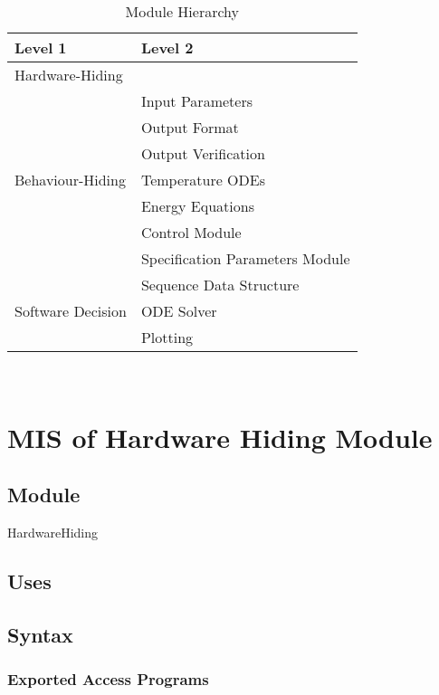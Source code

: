 \documentclass[12pt, titlepage]{article}
\begin{document}
\begin{table}[h!]
\centering
\begin{tabular}{p{} p{}}
\toprule
\textbf{Level 1} & \textbf{Level 2}\\
\midrule

{Hardware-Hiding} & ~ \\
\midrule

\multirow{7}{0.3\textwidth}{Behaviour-Hiding} & Input Parameters\\
& Output Format\\
& Output Verification\\
& Temperature ODEs\\
& Energy Equations\\ 
& Control Module\\
& Specification Parameters Module\\
\midrule

\multirow{3}{0.3\textwidth}{Software Decision} & {Sequence Data Structure}\\
& ODE Solver\\
& Plotting\\
\bottomrule

\end{tabular}
\caption{Module Hierarchy}
\label{TblMH}
\end{table}

\newpage
~\newpage

\section{MIS of Hardware Hiding Module} \label{Mod:HH} 

\subsection{Module}

HardwareHiding

\subsection{Uses}


\subsection{Syntax}

\subsubsection{Exported Access Programs}
\end{document}
